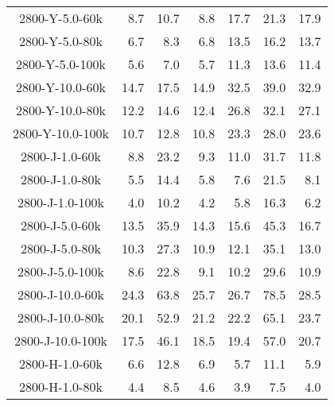 \begin{longtable}{crrrrrr}
      2800-Y-5.0-60k &         8.7 &        10.7 &         8.8 &           17.7 &           21.3 &           17.9 \\
      2800-Y-5.0-80k &         6.7 &         8.3 &         6.8 &           13.5 &           16.2 &           13.7 \\
      2800-Y-5.0-100k &         5.6 &         7.0 &         5.7 &           11.3 &           13.6 &           11.4 \\
      2800-Y-10.0-60k &        14.7 &        17.5 &        14.9 &           32.5 &           39.0 &           32.9 \\
      2800-Y-10.0-80k &        12.2 &        14.6 &        12.4 &           26.8 &           32.1 &           27.1 \\
      2800-Y-10.0-100k &        10.7 &        12.8 &        10.8 &           23.3 &           28.0 &           23.6 \\
      2800-J-1.0-60k &         8.8 &        23.2 &         9.3 &           11.0 &           31.7 &           11.8 \\
      2800-J-1.0-80k &         5.5 &        14.4 &         5.8 &            7.6 &           21.5 &            8.1 \\
      2800-J-1.0-100k &         4.0 &        10.2 &         4.2 &            5.8 &           16.3 &            6.2 \\
      2800-J-5.0-60k &        13.5 &        35.9 &        14.3 &           15.6 &           45.3 &           16.7 \\
      2800-J-5.0-80k &        10.3 &        27.3 &        10.9 &           12.1 &           35.1 &           13.0 \\
      2800-J-5.0-100k &         8.6 &        22.8 &         9.1 &           10.2 &           29.6 &           10.9 \\
      2800-J-10.0-60k &        24.3 &        63.8 &        25.7 &           26.7 &           78.5 &           28.5 \\
      2800-J-10.0-80k &        20.1 &        52.9 &        21.2 &           22.2 &           65.1 &           23.7 \\
      2800-J-10.0-100k &        17.5 &        46.1 &        18.5 &           19.4 &           57.0 &           20.7 \\
      2800-H-1.0-60k &         6.6 &        12.8 &         6.9 &            5.7 &           11.1 &            5.9 \\
      2800-H-1.0-80k &         4.4 &         8.5 &         4.6 &            3.9 &            7.5 &            4.0 \\

\end{longtable}
